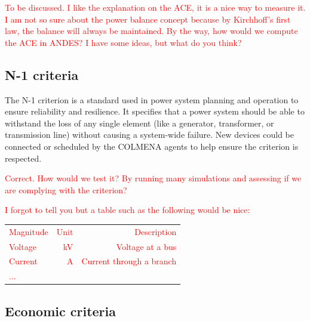 \documentclass{article}
\begin{document}
\textcolor{red}{To be discussed. I like the explanation on the ACE, it is a nice way to measure it. I am not so sure about the power balance concept because by Kirchhoff's first law, the balance will always be maintained. By the way, how would we compute the ACE in ANDES? I have some ideas, but what do you think?}

\subsection*{N-1 criteria}

The N-1 criterion is a standard used in power system planning and operation to ensure reliability and resilience. It specifies that a power system should be able to withstand the loss of any single element (like a generator, transformer, or transmission line) without causing a system-wide failure. New devices could be connected or scheduled by the COLMENA agents to help ensure the criterion is respected. 

\textcolor{red}{Correct. How would we test it? By running many simulations and assessing if we are complying with the criterion?}

\textcolor{red}{I forgot to tell you but a table such as the following would be nice:}

\textcolor{red}{
\begin{tabular}{lrr}
    Magnitude & Unit & Description \\
    Voltage & kV & Voltage at a bus \\
    Current & A & Current through a branch \\
    ...
\end{tabular}
}


\subsection*{Economic criteria}


\end{document}

